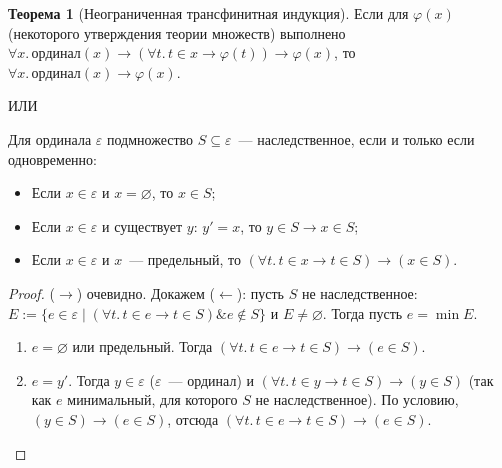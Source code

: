 \documentclass[a4paper,11pt]{article}
\theoremstyle{definition}
\newtheorem*{thm}{Теорема}
\newcommand{\amp}{\mathbin{\&}}
\begin{document}
\begin{thm}[Неограниченная трансфинитная индукция]
Если для $\varphi(x)$ (некоторого утверждения теории множеств) выполнено
$\forall x.\,\text{ординал}(x) \to (\forall t.\,t \in x \to \varphi(t)) \to
\varphi(x)$, то $\forall x.\,\text{ординал}(x) \to \varphi(x)$.

ИЛИ

Для ординала $\varepsilon$ подмножество $S \subseteq \varepsilon$~---
наследственное, если и только если одновременно:
\begin{itemize}
\item Если $x \in \varepsilon$ и $x = \varnothing$, то $x \in S$;
\item Если $x \in \varepsilon$ и существует $y$: $y' = x$, то $y \in S \to x \in
  S$;
\item Если $x \in \varepsilon$ и $x$~--- предельный, то $(\forall t.\,t \in x \to
  t \in S) \to (x \in S)$.
\end{itemize}
\end{thm}
\begin{proof}
($\to$) очевидно. Докажем ($\leftarrow$): пусть $S$ не наследственное: $E :=
\{e \in \varepsilon \mid (\forall t.\,t \in e \to t \in S) \amp e \notin S\}$ и
$E \ne \varnothing$. Тогда пусть $e = \min E$.
\begin{enumerate}
\item $e = \varnothing$ или предельный. Тогда $(\forall t.\,t \in e \to t \in S)
  \to (e \in S)$.
\item $e = y'$. Тогда $y \in \varepsilon$ ($\varepsilon$~--- ординал) и $(\forall
  t.\,t \in y \to t \in S) \to (y \in S)$ (так как $e$ минимальный, для
  которого $S$ не наследственное). По условию, $(y \in S) \to (e \in S)$, отсюда
  $(\forall t.\,t \in e \to t \in S) \to (e \in S)$.
\end{enumerate}
\end{proof}
\end{document}
